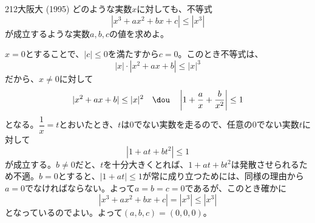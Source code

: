 \begin{prob}{212}{}{大阪大 (1995)}
 どのような実数$x$に対しても、不等式
 \[ |x^3+ax^2+bx+c| \le |x^3| \]
 が成立するような実数$a, b, c$の値を求めよ。
\end{prob}
$x=0$とすることで、$|c|\le 0$を満たすから$c=0$。このとき不等式は、
\[ |x|\cdot|x^2+ax+b| \le |x|^3 \]
だから、$x\neq 0$に対して
\[ |x^2+ax+b|\le |x|^2 \quad\dou\quad \left|1+\frac{a}{x}+\frac{b}{x^2}\right| \le 1 \]
となる。$\dfrac{1}{x}=t$とおいたとき、$t$は0でない実数を走るので、任意の0でない実数$t$に対して
\[ |1+at+bt^2| \le 1 \]
が成立する。$b\neq 0$だと、$t$を十分大きくとれば、$1+at+bt^2$は発散させられるため不適。$b=0$とすると、$|1+at|\le 1$が常に成り立つためには、同様の理由から$a=0$でなければならない。よって$a=b=c=0$であるが、このとき確かに
\[ |x^3+ax^2+bx+c|=|x^3|\le |x^3| \]
となっているのでよい。よって$(a, b, c)=(0, 0, 0)$。